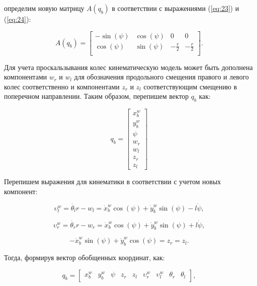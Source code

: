 \documentclass[14pt, a4paper]{extreport}
\begin{document}
\noindent
определим новую матрицу $A(q_b)$ в соответствии с выражениями (\ref{eq:23}) и (\ref{eq:24}):

\begin{equation}
A(q_b) = 
\begin{bmatrix}
-\sin(\psi) & \cos(\psi) & 0 & 0\\[1mm]
\cos(\psi) & \sin(\psi) & -\frac{r}{2} & -\frac{r}{2}\\[1mm]
\end{bmatrix}.
\tag{26} \label{eq:26}
\end{equation}

Для учета проскальзывания колес кинематическую модель может быть дополнена компонентами $w_r$ и $w_l$ для обозначения продольного смещения правого и левого колес соответственно и компонентами $z_r$ и  $z_l$ соответствующим смещению в поперечном направлении. Таким образом, перепишем вектор $q_b$ как:

\begin{equation}
q_b = 
\begin{bmatrix}
x^w_b\\[1mm] y^w_b\\[1mm] \psi\\[1mm] w_r\\[1mm] w_l\\[1mm] z_r\\[1mm] z_l
\end{bmatrix}
\tag{27} \label{eq:27}
\end{equation}

Перепишем выражения для кинематики в соответствии с учетом новых компонент:

\begin{equation}
\upsilon_l^w = \dot{\theta{_l}}r - w_l = \dot{x}_b^w\cos(\psi) + \dot{y}_b^w\sin(\psi) - l\dot{\psi},
\tag{28} \label{eq:28}
\end{equation}

\begin{equation}
\upsilon_r^w = \dot{\theta{_r}}r - w_r = \dot{x}_b^w\cos(\psi) + \dot{y}_b^w\sin(\psi) + l\dot{\psi},
\tag{29} \label{eq:29}
\end{equation}

\begin{equation}
-\dot{x}^w_b\sin(\psi) + \dot{y}^w_b\cos(\psi) = z_r = z_l.
\tag{30} \label{eq:30}
\end{equation}

Тогда, формируя вектор обобщенных координат, как:

\begin{equation}
q_b = 
\begin{bmatrix}
x^w_b& y^w_b& \psi& z_r& z_l& \upsilon_r^w& \upsilon_l^w& \theta_r& \theta_l
\end{bmatrix},
\tag{31} \label{eq:31}
\end{equation}
\vspace{2mm}
\end{document}
